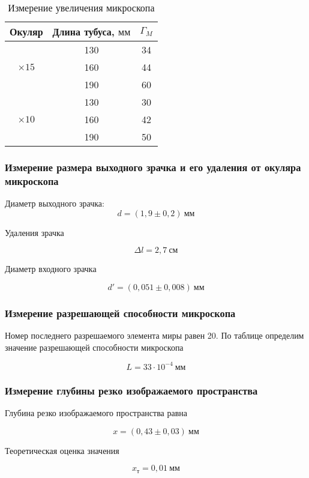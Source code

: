 \documentclass[a4paper, 12pt]{article}
\begin{document}
\begin{table}[H]
\centering
\begin{tabular}{|c|c|c|}
    \hline 
    Окуляр & \specialcell{Длина тубуса,\\[-9pt] $\text{мм}$} & $\Gamma_M$ \\ \hline 
    \multirow{3}{*}{$\times 15$} & 130 & 34 \\ \cline{2-3} 
    & 160 & 44\\ \cline{2-3} 
    & 190 & 60\\ \hline 
    \multirow{3}{*}{$\times 10$} & 130 & 30 \\ \cline{2-3} 
    & 160 & 42 \\ \cline{2-3}
    & 190 & 50 \\ \hline  
\end{tabular}
\caption{Измерение увеличения микроскопа}
\end{table}

\subsubsection*{Измерение размера выходного зрачка и его удаления от
окуляра микроскопа}

Диаметр выходного зрачка: 
\[
    d = (1,9 \pm 0,2)\ \text{мм}
\]

Удаления зрачка 

\[
    \Delta l = 2,7\ \text{см}
\]

Диаметр входного зрачка

\[
    d' = (0,051\pm 0,008)\ \text{мм}
\]

\subsubsection*{Измерение разрешающей способности микроскопа}
Номер последнего разрешаемого элемента миры равен 20.  По таблице
определим значение разрешающей способности микроскопа

\[
    L = 33\cdot 10^{-4}\ \text{мм}
\]

\subsubsection*{Измерение глубины резко изображаемого пространства}
Глубина резко изображаемого пространства равна

\[
    x = (0,43\pm 0,03)\ \text{мм}
\]

Теоретическая оценка значения

\[
    x_{\text{т}} = 0,01\ \text{мм}
\]
\end{document}
